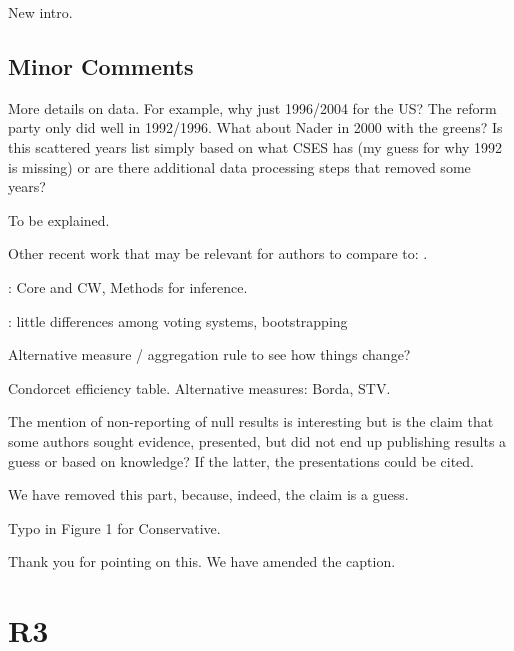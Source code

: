 \documentclass[a4paper, 12pt]{scrartcl}
\theoremstyle{break}
\newenvironment{changes}{\par\color{violet}\par\addvspace{\baselineskip}}{\par\addvspace{\baselineskip}}
\begin{document}
New intro.

\subsection{Minor Comments}
\begin{changes}
	More details on data. For example, why just 1996/2004 for the US? The reform party only did well in 1992/1996. What about Nader in 2000 with the greens? Is this scattered years list simply based on what CSES has (my guess for why 1992 is missing) or are there additional data processing steps that removed some years?
\end{changes}

To be explained.

\begin{changes}
	Other recent work that may be relevant for authors to compare to: \cite{Desai2024, Darmann2019}.
\end{changes}

\citeauthor{Desai2024}: Core and CW, Methods for inference.

\citeauthor{Darmann2019}: little differences among voting systems, bootstrapping


\begin{changes}
Alternative measure / aggregation rule to see how things change?
\end{changes}

Condorcet efficiency table. Alternative measures: Borda, STV. 

\begin{changes}
	The mention of non-reporting of null results is interesting but is the claim that some authors sought evidence, presented, but did not end up publishing results a guess or based on knowledge? If the latter, the presentations could be cited.
\end{changes}

We have removed this part, because, indeed, the claim is a guess.

\begin{changes}
	Typo in Figure 1 for Conservative.
\end{changes}
Thank you for pointing on this. We have amended the caption. 

\newpage
\section{R3}
\end{document}
